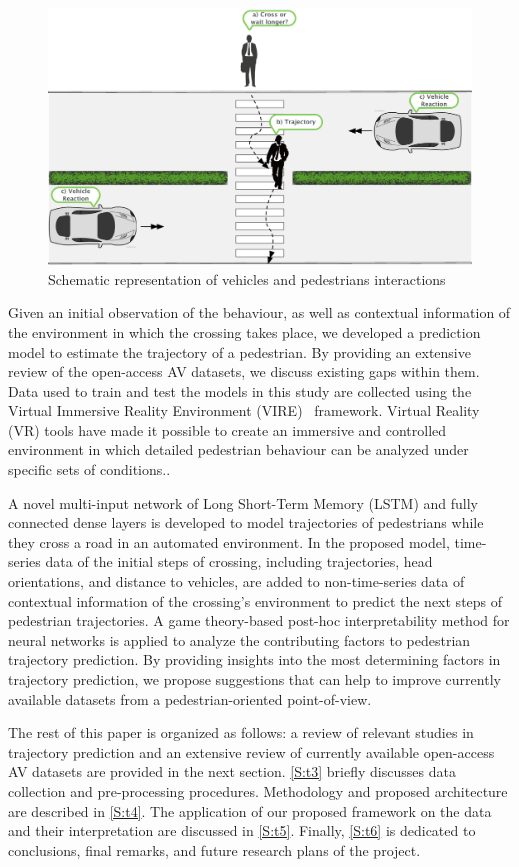 \begin{figure}
    \centering
    \includegraphics[scale=0.7]{chapter_6/figures/cross.pdf}
    \caption{Schematic representation of vehicles and pedestrians interactions}
    \label{fig:Tinteraction}
\end{figure}

Given an initial observation of the behaviour, as well as contextual information of the environment in which the crossing takes place, we developed a prediction model to estimate the trajectory of a pedestrian. By providing an extensive review of the open-access AV datasets, we discuss existing gaps within them. Data used to train and test the models in this study are collected using the Virtual Immersive Reality Environment (VIRE)~\cite{farooqvire} framework. Virtual Reality (VR) tools have made it possible to create an immersive and controlled environment in which detailed pedestrian behaviour can be analyzed under specific sets of conditions.. 

A novel multi-input network of Long Short-Term Memory (LSTM) and fully connected dense layers is developed to model trajectories of pedestrians while they cross a road in an automated environment. In the proposed model, time-series data of the initial steps of crossing, including trajectories, head orientations, and distance to vehicles, are added to non-time-series data of contextual information of the crossing's environment to predict the next steps of pedestrian trajectories. A game theory-based post-hoc interpretability method for neural networks is applied to analyze the contributing factors to pedestrian trajectory prediction. By providing insights into the most determining factors in trajectory prediction, we propose suggestions that can help to improve currently available datasets from a pedestrian-oriented point-of-view.  

The rest of this paper is organized as follows: a review of relevant studies in trajectory prediction and an extensive review of currently available open-access AV datasets are provided in the next section. \cref{S:t3} briefly discusses data collection and pre-processing procedures. Methodology and proposed architecture are described in \cref{S:t4}. The application of our proposed framework on the data and their interpretation are discussed in \cref{S:t5}. Finally, \cref{S:t6} is dedicated to conclusions, final remarks, and future research plans of the project.